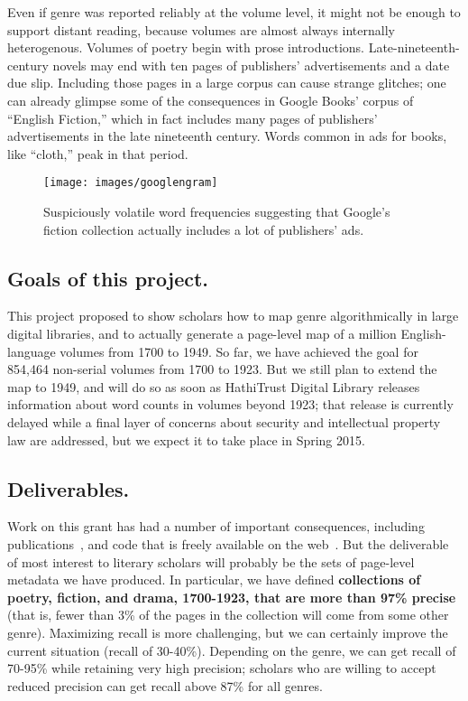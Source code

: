 \documentclass[paper=a4, fontsize=12pt]{scrartcl}
\numberwithin{equation}{section}		%
\numberwithin{figure}{section}			%
\numberwithin{table}{section}				%
\begin{document}
\newpage
Even if genre was reported reliably at the volume level, it might not be enough to support distant reading, because volumes are almost always internally heterogenous. Volumes of poetry  begin with prose introductions. Late-nineteenth-century novels may end with ten pages of publishers' advertisements and a date due slip. Including those pages in a large corpus can cause strange glitches; one can already glimpse some of the consequences in Google Books' corpus of ``English Fiction,'' which in fact includes many pages of publishers' advertisements in the late nineteenth century. Words common in ads for books, like ``cloth,'' peak in that period.

\begin{figure}[!h]
\centering
\texttt{[image: images/googlengram]}
\caption{Suspiciously volatile word frequencies suggesting that Google's fiction collection actually includes a lot of publishers' ads.}
\end{figure}

\newpage
\subsection{Goals of this project.}
This project proposed to show scholars how to map genre algorithmically in large digital libraries, and to actually generate a page-level map of a million English-language volumes from 1700 to 1949. So far, we have achieved the goal for 854,464 non-serial volumes from 1700 to 1923. But we still plan to extend the map to 1949, and will do so as soon as HathiTrust Digital Library releases information about word counts in volumes beyond 1923; that release is currently delayed while a final layer of concerns about security and intellectual property law are addressed, but we expect it to take place in Spring 2015.

\subsection{Deliverables.}
Work on this grant has had a number of important consequences, including publications~\cite{underwood:mutable, underwood:blurry, underwood:slate}, and code that is freely available on the web~\cite{underwood:genrerepo}. But the deliverable of most interest to literary scholars will probably be the sets of page-level metadata we have produced. In particular, we have defined \textbf{collections of poetry, fiction, and drama, 1700-1923, that are more than 97\% precise} (that is, fewer than 3\% of the pages in the collection will come from some other genre). Maximizing recall is more challenging, but we can certainly improve the current situation (recall of 30-40\%). Depending on the genre, we can get recall of 70-95\% while retaining very high precision; scholars who are willing to accept reduced precision can get recall above 87\% for all genres.
\end{document}
